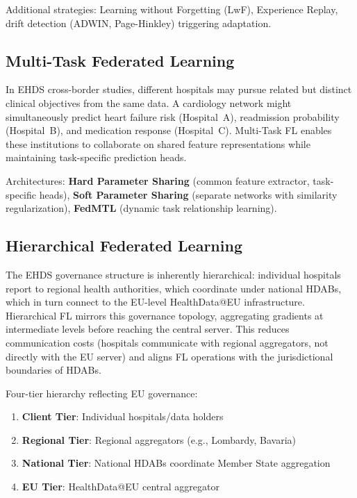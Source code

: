 \documentclass[conference,a4paper]{IEEEtran}
\begin{document}
Additional strategies: Learning without Forgetting (LwF), Experience Replay, drift detection (ADWIN, Page-Hinkley) triggering adaptation.

\subsection{Multi-Task Federated Learning}

In EHDS cross-border studies, different hospitals may pursue related but distinct clinical objectives from the same data. A cardiology network might simultaneously predict heart failure risk (Hospital~A), readmission probability (Hospital~B), and medication response (Hospital~C). Multi-Task FL enables these institutions to collaborate on shared feature representations while maintaining task-specific prediction heads.

Architectures: \textbf{Hard Parameter Sharing} (common feature extractor, task-specific heads), \textbf{Soft Parameter Sharing} (separate networks with similarity regularization), \textbf{FedMTL} (dynamic task relationship learning).

\subsection{Hierarchical Federated Learning}

The EHDS governance structure is inherently hierarchical: individual hospitals report to regional health authorities, which coordinate under national HDABs, which in turn connect to the EU-level HealthData@EU infrastructure. Hierarchical FL mirrors this governance topology, aggregating gradients at intermediate levels before reaching the central server. This reduces communication costs (hospitals communicate with regional aggregators, not directly with the EU server) and aligns FL operations with the jurisdictional boundaries of HDABs.

Four-tier hierarchy reflecting EU governance:
\begin{enumerate}
    \item \textbf{Client Tier}: Individual hospitals/data holders
    \item \textbf{Regional Tier}: Regional aggregators (e.g., Lombardy, Bavaria)
    \item \textbf{National Tier}: National HDABs coordinate Member State aggregation
    \item \textbf{EU Tier}: HealthData@EU central aggregator
\end{enumerate}
\end{document}

